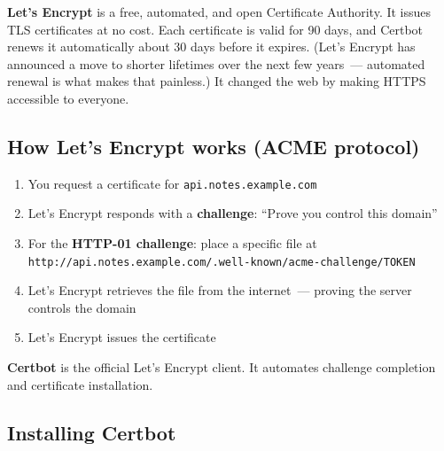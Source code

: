 \noindent{}\textbf{Let's Encrypt} is a free, automated, and open Certificate Authority. It issues TLS certificates at no cost. Each certificate is valid for 90 days, and Certbot renews it automatically about 30 days before it expires. (Let's Encrypt has announced a move to shorter lifetimes over the next few years~--- automated renewal is what makes that painless.) It changed the web by making HTTPS accessible to everyone.

\subsection*{How Let's Encrypt works (ACME protocol)}\label{28-traffic-routing:how-lets-encrypt-works-acme-protocol}

\begin{enumerate}
\def\labelenumi{\arabic{enumi}.}
\tightlist
\item
  You request a certificate for \texttt{api.notes.example.com}
\item
  Let's Encrypt responds with a \textbf{challenge}: ``Prove you control this domain''
\item
  For the \textbf{HTTP-01 challenge}: place a specific file at \texttt{http:}\allowbreak{}\texttt{/}\allowbreak{}\texttt{/}\allowbreak{}\texttt{api.}\allowbreak{}\texttt{notes.}\allowbreak{}\texttt{example.}\allowbreak{}\texttt{com/}\allowbreak{}\texttt{.}\allowbreak{}\texttt{well-}\allowbreak{}\texttt{known/}\allowbreak{}\texttt{acme-}\allowbreak{}\texttt{challenge/}\allowbreak{}\texttt{TOKEN}
\item
  Let's Encrypt retrieves the file from the internet~--- proving the server controls the domain
\item
  Let's Encrypt issues the certificate
\end{enumerate}

\noindent{}\textbf{Certbot} is the official Let's Encrypt client. It automates challenge completion and certificate installation.

\subsection*{Installing Certbot}\label{28-traffic-routing:installing-certbot}

\begin{codebox}[short]

\begin{Shaded}
\begin{Highlighting}[]
\end{Highlighting}
\end{Shaded}

\end{codebox}


